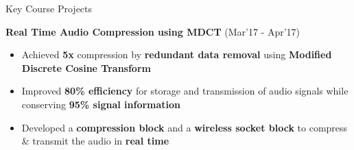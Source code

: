 \documentclass{resume}
\newcommand{\sepval}{-0.5em}
\begin{document}
\begin{rSection}{Key Course Projects}

\vspace{-0.1cm}

\item {\bf{Real Time Audio Compression using MDCT}} \hfill{(Mar'17 - Apr'17)}\\
[-0.4cm]

\begin{itemize}[leftmargin=*]

	\itemsep \sepval

	\item Achieved {\bf 5x} compression by {\bf redundant data removal} using {\bf{Modified Discrete Cosine Transform}}

	\item Improved {\bf 80\% efficiency} for storage and transmission of audio signals while conserving {\bf 95\% signal information}

	\item Developed a {\bf compression block} and a {\bf wireless socket block} to compress \& transmit the audio in {\bf real time}

\end{itemize}

%
%
%
%
%
%
%
%
%
%
%

\end{rSection}
\end{document}
